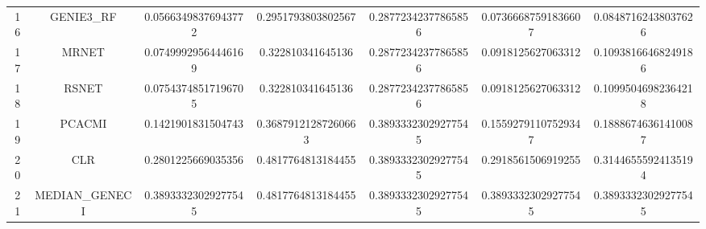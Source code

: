 \documentclass[a4paper,10pt]{article}
\begin{document}
\begin{landscape}
\begin{table}[!htp]
\begin{tabular}{ccccccc}
16&GENIE3_RF&0.05663498376943772&0.2951793803802567&0.28772342377865856&0.07366687591836607&0.08487162438037626\\
17&MRNET&0.07499929564446169&0.322810341645136&0.28772342377865856&0.0918125627063312&0.10938166468249186\\
18&RSNET&0.07543748517196705&0.322810341645136&0.28772342377865856&0.0918125627063312&0.10995046982364218\\
19&PCACMI&0.1421901831504743&0.36879121287260663&0.38933323029277545&0.15592791107529347&0.18886746361410087\\
20&CLR&0.2801225669035356&0.4817764813184455&0.38933323029277545&0.2918561506919255&0.31446555924135194\\
21&MEDIAN_GENECI&0.38933323029277545&0.4817764813184455&0.38933323029277545&0.38933323029277545&0.38933323029277545\\
\hline
\end{tabular}
\end{table}


\newpage


\end{landscape}
\end{document}
